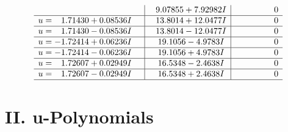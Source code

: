 \documentclass[1p]{elsarticle_modified}
\theoremstyle{definition}
\begin{document}
$$\begin{array}{c|c|c}
 & \phantom{-}9.07855 + 7.92982 I & \phantom{-0.000000 } 0 \\ \hline\begin{aligned}
u &= \phantom{-}1.71430 + 0.08536 I\end{aligned}
 & \phantom{-}13.8014 + 12.0477 I & \phantom{-0.000000 } 0 \\ \hline\begin{aligned}
u &= \phantom{-}1.71430 - 0.08536 I\end{aligned}
 & \phantom{-}13.8014 - 12.0477 I & \phantom{-0.000000 } 0 \\ \hline\begin{aligned}
u &= -1.72414 + 0.06236 I\end{aligned}
 & \phantom{-}19.1056 - 4.9783 I & \phantom{-0.000000 } 0 \\ \hline\begin{aligned}
u &= -1.72414 - 0.06236 I\end{aligned}
 & \phantom{-}19.1056 + 4.9783 I & \phantom{-0.000000 } 0 \\ \hline\begin{aligned}
u &= \phantom{-}1.72607 + 0.02949 I\end{aligned}
 & \phantom{-}16.5348 - 2.4638 I & \phantom{-0.000000 } 0 \\ \hline\begin{aligned}
u &= \phantom{-}1.72607 - 0.02949 I\end{aligned}
 & \phantom{-}16.5348 + 2.4638 I & \phantom{-0.000000 } 0\\
 \hline 
 \end{array}$$\newpage
\newpage\renewcommand{\arraystretch}{1}
\centering \section*{ II. u-Polynomials}
\end{document}
